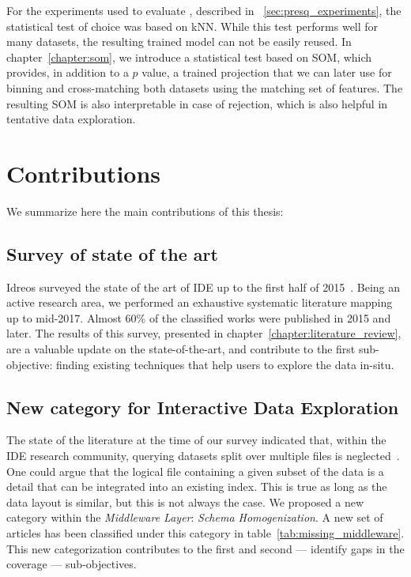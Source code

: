For the experiments used to evaluate \PresQ, described in ~\ref{sec:presq_experiments},
the statistical test of choice was based on \gls{kNN}. While this test
performs well for many datasets, the resulting trained model can not be easily reused.
In chapter~\ref{chapter:som}, we introduce a statistical test based on \gls{SOM}, which provides,
in addition to a $p$ value, a trained projection that we can later use for binning and
cross-matching both datasets using the matching set of features. The resulting \gls{SOM}
is also interpretable in case of rejection, which is also helpful in tentative data exploration.

\section{Contributions}

We summarize here the main contributions of this thesis:

\subsection{Survey of state of the art}
Idreos \etal surveyed the state of the art of \gls{IDE} up to the first half of 2015~\cite{Idreos2015}.
Being an active research area, we performed an exhaustive systematic literature mapping up to mid-2017.
Almost 60\% of the classified works were published in 2015 and later. The results
of this survey, presented in chapter~\ref{chapter:literature_review}, are a valuable update on
the state-of-the-art, and contribute to the first sub-objective: finding existing techniques that help users
to explore the data in-situ.

\subsection{New category for Interactive Data Exploration}
The state of the literature at the time of our survey indicated that, within the
\gls{IDE} research community, querying datasets split over multiple files is
neglected~\cite{Silva2016}. One could argue that the logical file containing a given
subset of the data is a detail that can be integrated into an existing index. This is
true as long as the data layout is similar, but this is not always the case.
We proposed a new category within the \emph{Middleware Layer}: \emph{Schema Homogenization}.
A new set of articles has been classified under this category in table~\ref{tab:missing_middleware}.
This new categorization contributes to the first and second --- identify gaps in the coverage --- sub-objectives.

